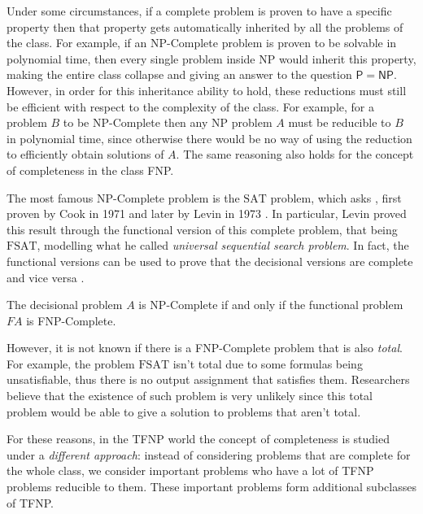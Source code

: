 Under some circumstances, if a complete problem is proven to have a specific property then that property gets automatically inherited by all the problems of the class. For example, if an \textsf{NP}-Complete problem is proven to be solvable in polynomial time, then every single problem inside \textsf{NP} would inherit this property, making the entire class collapse and giving an answer to the question $\mathsf{P} = \mathsf{NP}$. However, in order for this inheritance ability to hold, these reductions must still be efficient with respect to the complexity of the class. For example, for a problem $B$ to be \textsf{NP}-Complete then any \textsf{NP} problem $A$ must be reducible to $B$ in polynomial time, since otherwise there would be no way of using the reduction to efficiently obtain solutions of $A$. The same reasoning also holds for the concept of completeness in the class \textsf{FNP}.

The most famous \textsf{NP}-Complete problem is the $\mathrm{SAT}$ problem, which asks , first proven by Cook in 1971 \cite{cook_sat} and later by Levin in 1973 \cite{levin_fsat}. In particular, Levin proved this result through the functional version of this complete problem, that being $\mathrm{FSAT}$, modelling what he called \textit{universal sequential search problem}. In fact, the functional versions can be used to prove that the decisional versions are complete and vice versa \cite{rel_comp_np_search}.

\begin{proposition}
    The decisional problem $A$ is \textsf{NP}-Complete if and only if the functional problem $FA$ is \textsf{FNP}-Complete.
\end{proposition}
    
However, it is not known if there is a \textsf{FNP}-Complete problem that is also \textit{total}. For example, the problem $\mathrm{FSAT}$ isn't total due to some formulas being unsatisfiable, thus there is no output assignment that satisfies them. Researchers believe that the existence of such problem is very unlikely since this total problem would be able to give a solution to problems that aren't total. 

For these reasons, in the \textsf{TFNP} world the concept of completeness is studied under a \textit{different approach}: instead of considering problems that are complete for the whole class, we consider important problems who have a lot of \textsf{TFNP} problems reducible to them. These important problems form additional subclasses of \textsf{TFNP}.  

